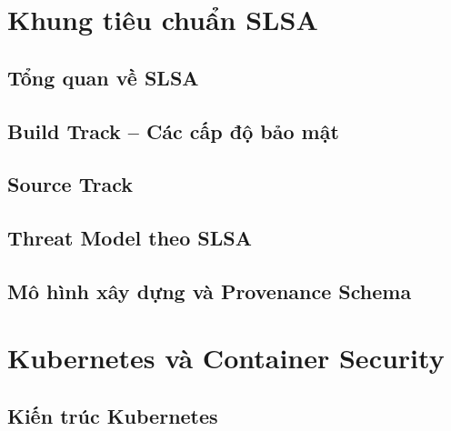 \section{Khung tiêu chuẩn SLSA}

\subsection{Tổng quan về SLSA}

\subsection{Build Track -- Các cấp độ bảo mật}

\subsection{Source Track}

\subsection{Threat Model theo SLSA}

\subsection{Mô hình xây dựng và Provenance Schema}

\section{Kubernetes và Container Security}

\subsection{Kiến trúc Kubernetes}

